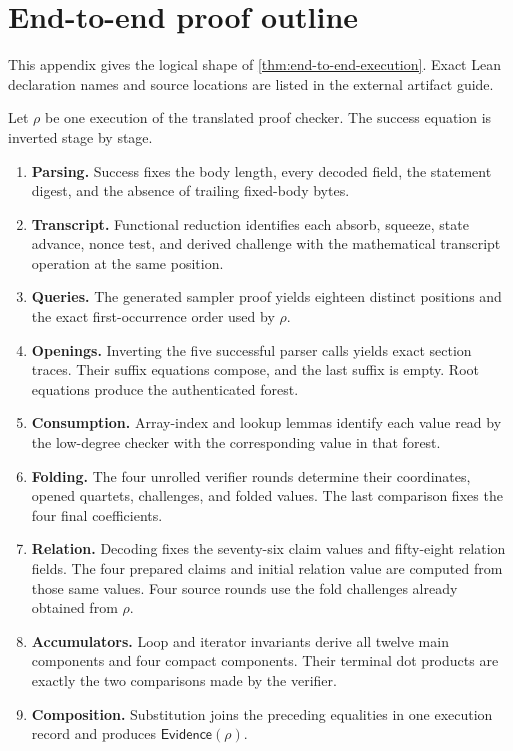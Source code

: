 \section{End-to-end proof outline}
\label{app:end-to-end-outline}

This appendix gives the logical shape of \cref{thm:end-to-end-execution}.
Exact Lean declaration names and source locations are listed in the external
artifact guide.

Let \(\rho\) be one execution of the translated proof checker.  The success
equation is inverted stage by stage.

\begin{enumerate}[leftmargin=*]
  \item \textbf{Parsing.}  Success fixes the body length, every decoded field,
        the statement digest, and the absence of trailing fixed-body bytes.
  \item \textbf{Transcript.}  Functional reduction identifies each absorb,
        squeeze, state advance, nonce test, and derived challenge with the
        mathematical transcript operation at the same position.
  \item \textbf{Queries.}  The generated sampler proof yields eighteen
        distinct positions and the exact first-occurrence order used by
        \(\rho\).
  \item \textbf{Openings.}  Inverting the five successful parser calls yields
        exact section traces.  Their suffix equations compose, and the last
        suffix is empty.  Root equations produce the authenticated forest.
  \item \textbf{Consumption.}  Array-index and lookup lemmas identify each
        value read by the low-degree checker with the corresponding value in
        that forest.
  \item \textbf{Folding.}  The four unrolled verifier rounds determine their
        coordinates, opened quartets, challenges, and folded values.  The last
        comparison fixes the four final coefficients.
  \item \textbf{Relation.}  Decoding fixes the seventy-six claim values and
        fifty-eight relation fields.  The four prepared claims and initial
        relation value are computed from those same values.  Four source
        rounds use the fold challenges already obtained from \(\rho\).
  \item \textbf{Accumulators.}  Loop and iterator invariants derive all twelve
        main components and four compact components.  Their terminal dot
        products are exactly the two comparisons made by the verifier.
  \item \textbf{Composition.}  Substitution joins the preceding equalities in
        one execution record and produces \(\mathsf{Evidence}(\rho)\).
\end{enumerate}

